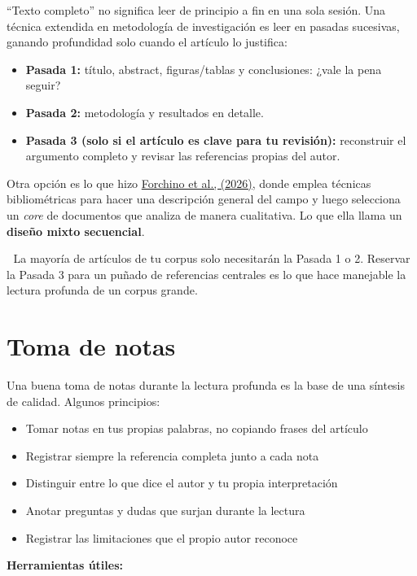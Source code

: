 \documentclass[
]{book}
\providecommand{\tightlist}{%
  \setlength{\itemsep}{0pt}\setlength{\parskip}{0pt}}
\begin{document}
``Texto completo'' no significa leer de principio a fin en una sola sesión. Una técnica extendida en metodología de investigación es leer en pasadas sucesivas, ganando profundidad solo cuando el artículo lo justifica:

\begin{itemize}
\tightlist
\item
  \textbf{Pasada 1:} título, abstract, figuras/tablas y conclusiones: ¿vale la pena seguir? 🤔
\item
  \textbf{Pasada 2:} metodología y resultados en detalle.
\item
  \textbf{Pasada 3 (solo si el artículo es clave para tu revisión):} reconstruir el argumento completo y revisar las referencias propias del autor.
\end{itemize}

Otra opción es lo que hizo \href{https://doi.org/10.5281/zenodo.20643687}{Forchino et al., (2026)}, donde emplea técnicas bibliométricas para hacer una descripción general del campo y luego selecciona un \emph{core} de documentos que analiza de manera cualitativa. Lo que ella llama un \textbf{diseño mixto secuencial}.

👣 La mayoría de artículos de tu corpus solo necesitarán la Pasada 1 o 2. Reservar la Pasada 3 para un puñado de referencias centrales es lo que hace manejable la lectura profunda de un corpus grande.

\section{Toma de notas}\label{toma-de-notas}

Una buena toma de notas durante la lectura profunda es la base de una síntesis de calidad. Algunos principios:

\begin{itemize}
\tightlist
\item
  Tomar notas en tus propias palabras, no copiando frases del artículo
\item
  Registrar siempre la referencia completa junto a cada nota
\item
  Distinguir entre lo que dice el autor y tu propia interpretación
\item
  Anotar preguntas y dudas que surjan durante la lectura
\item
  Registrar las limitaciones que el propio autor reconoce
\end{itemize}

\textbf{Herramientas útiles:}
\end{document}
